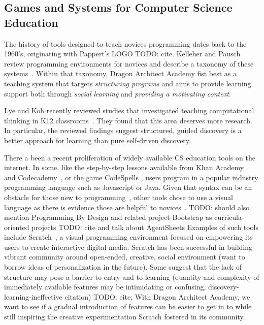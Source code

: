 \documentclass{sig-alternate}
\newcommand{\TODO}[1]{{\color{red} TODO: #1}}
\newcommand{\gametitle}{{\color{RoyalPurple} Dragon Architect Academy}}
\begin{document}
\subsection{Games and Systems for Computer Science Education}
The history of tools designed to teach novices programming dates back to the 1960's, originating with Pappert's LOGO \TODO{cite}.
Kelleher and Pausch review programming environments for novices and describe a taxonomy of these systems~\cite{kelleher2005lowering}.
Within that taxonomy, \gametitle{} fist best as a teaching system that targets \emph{structuring programs} and aims to provide learning support both through \emph{social learning} and \emph{providing a motivating context}.

Lye and Koh recently reviewed studies that investigated teaching computational thinking in K12 classrooms~\cite{lye2014review}.
They found that this area deserves more research.
In particular, the reviewed findings suggest structured, guided discovery is a better approach for learning than pure self-driven discovery.

There a been a recent proliferation of widely available CS education tools on the internet.
In some, like the step-by-step lessons available from Khan Academy~\cite{khanacademy} and Codecademy~\cite{codecademy}, or the game CodeSpells \cite{esper2013codespells}, users program in a popular industry programming language such as Javascript or Java.
Given that syntax can be an obstacle for those new to programming~\cite{stefik2013syntax}, other tools chose to use a visual language as there is evidence those are helpful to novices~\cite{whitley1997visual}.
\TODO{should also mention Programming By Design and related project Bootstrap as curricula-oriented projects}
\TODO{cite and talk about AgentSheets}
Examples of such tools include Scratch~\cite{maloney2010scratch}, a visual programming environment focused on empowering its users to create interactive digital media.
Scratch has been successful in building vibrant community around open-ended, creative, social environment (want to borrow ideas of personalization in the future).
Some suggest that the lack of structure may pose a barrier to entry and to learning (quantity and complexity of immediately available features may be intimidating or confusing, discovery-learning-ineffective citation) \TODO{cite};
With \gametitle{}, we want to see if a gradual introduction of features can be easier to get in to while still inspiring the creative experimentation Scratch fostered in its community.
\end{document}
